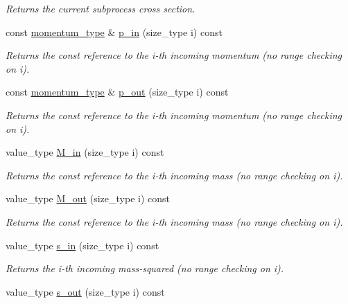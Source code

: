 \begin{DoxyCompactItemize}
\begin{DoxyCompactList}\small\item\em Returns the current subprocess cross section. \end{DoxyCompactList}\item 
const \hyperlink{a00579}{momentum\+\_\+type} \& \hyperlink{a00212_a4c3a6383c0445188ee515615b536f41d}{p\+\_\+in} (size\+\_\+type i) const 
\begin{DoxyCompactList}\small\item\em Returns the const reference to the i-\/th incoming momentum (no range checking on i). \end{DoxyCompactList}\item 
const \hyperlink{a00579}{momentum\+\_\+type} \& \hyperlink{a00212_affd056f9744793eef4d9cefec5d3ffb5}{p\+\_\+out} (size\+\_\+type i) const 
\begin{DoxyCompactList}\small\item\em Returns the const reference to the i-\/th incoming momentum (no range checking on i). \end{DoxyCompactList}\item 
value\+\_\+type \hyperlink{a00212_ae0e389444b66a76c7b22fd996cf16bd8}{M\+\_\+in} (size\+\_\+type i) const 
\begin{DoxyCompactList}\small\item\em Returns the const reference to the i-\/th incoming mass (no range checking on i). \end{DoxyCompactList}\item 
value\+\_\+type \hyperlink{a00212_a1aed7b697e6158749701f4fecaca42ee}{M\+\_\+out} (size\+\_\+type i) const 
\begin{DoxyCompactList}\small\item\em Returns the const reference to the i-\/th incoming mass (no range checking on i). \end{DoxyCompactList}\item 
\hypertarget{a00212_a6ae7fa6415e21a7cffc3dfc4dcbabeeb}{}value\+\_\+type \hyperlink{a00212_a6ae7fa6415e21a7cffc3dfc4dcbabeeb}{s\+\_\+in} (size\+\_\+type i) const \label{a00212_a6ae7fa6415e21a7cffc3dfc4dcbabeeb}

\begin{DoxyCompactList}\small\item\em Returns the i-\/th incoming mass-\/squared (no range checking on i). \end{DoxyCompactList}\item 
\hypertarget{a00212_a856af7863609bb4d14dafe1ee7024ce0}{}value\+\_\+type \hyperlink{a00212_a856af7863609bb4d14dafe1ee7024ce0}{s\+\_\+out} (size\+\_\+type i) const \label{a00212_a856af7863609bb4d14dafe1ee7024ce0}


\end{DoxyCompactItemize}
